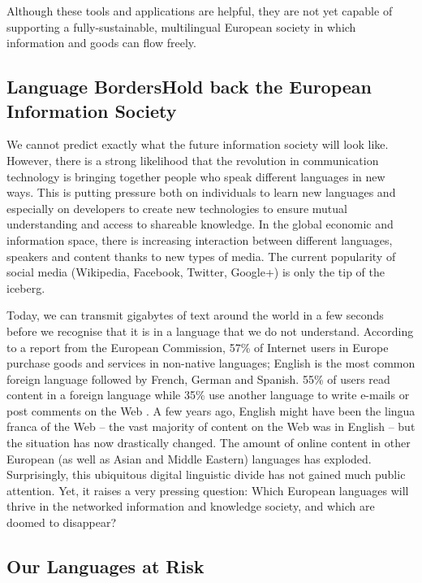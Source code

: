 \begin{multicols}{2}
Although these tools and applications are helpful, they are not yet capable of supporting a fully-sustainable, multilingual European society in which information and goods can flow freely.

\subsection[Language Borders Hold back the European Information Society]{Language Borders\newline Hold back the European Information Society}

We cannot predict exactly what the future information society will look like. However, there is a strong likelihood that the revolution in communication technology is bringing together people who speak different languages in new ways. This is putting pressure both on individuals to learn new languages and especially on developers to create new technologies to ensure mutual understanding and access to shareable knowledge. In the global economic and information space, there is increasing interaction between different languages, speakers and content thanks to new types of media. The current popularity of social media (Wikipedia, Facebook, Twitter, Google+) is only the tip of the iceberg.


Today, we can transmit gigabytes of text around the world in a few seconds before we recognise that it is in a language that we do not understand. According to a report from the European Commission, 57\% of Internet users in Europe purchase goods and services in non-native languages; English is the most common foreign language followed by French, German and Spanish. 55\% of users read content in a foreign language while 35\% use another language to write e-mails or post comments on the Web \cite{EC1}. A few years ago, English might have been the lingua franca of the Web -- the vast majority of content on the Web was in English -- but the situation has now drastically changed. The amount of online content in other European (as well as Asian and Middle Eastern) languages has exploded.
Surprisingly, this ubiquitous digital linguistic divide has not gained much public attention. Yet, it raises a very pressing question: Which European languages will thrive in the networked information and knowledge society, and which are doomed to disappear?

\subsection{Our Languages at Risk}


\end{multicols}
